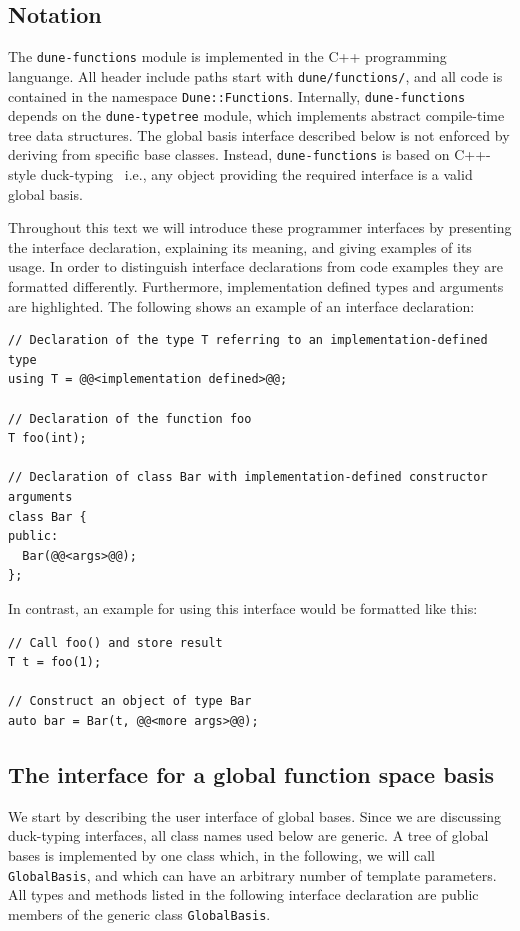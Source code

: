 \documentclass[a4paper,10pt,headings=normal,bibliography=totoc]{scrartcl}
\newcommand{\cpp}[1]{\lstinline[basicstyle=\ttfamily]!#1!}
\newcommand{\dunemodule}[1]{\texttt{#1}}
\begin{document}
\subsection*{Notation}

The \dunemodule{dune-functions} module is implemented in the C++ programming languange.
All header include paths
start with \cpp{dune/functions/}, and all code is contained in the namespace \cpp{Dune::Functions}.
Internally, \dunemodule{dune-functions} depends on the \dunemodule{dune-typetree} module,
which implements abstract compile-time tree data structures.
The global basis interface described below is not enforced by deriving
from specific base classes. Instead, \dunemodule{dune-functions} is based on
C++-style duck-typing~\cite{koenig_moo:2005}
i.e., any object providing the required
interface is a valid global basis.

Throughout this text we will introduce these programmer interfaces
by presenting the interface declaration, explaining
its meaning, and giving examples of its usage.
In order to distinguish interface declarations
from code examples they are formatted differently.
Furthermore, implementation defined types and arguments are highlighted.
The following shows an example of an interface declaration:
\begin{lstlisting}[style=Interface]
// Declaration of the type T referring to an implementation-defined type
using T = @@<implementation defined>@@;

// Declaration of the function foo
T foo(int);

// Declaration of class Bar with implementation-defined constructor arguments
class Bar {
public:
  Bar(@@<args>@@);
};
\end{lstlisting}
In contrast,
an example for using this interface would be formatted like this:
\begin{lstlisting}[style=Example]
// Call foo() and store result
T t = foo(1);

// Construct an object of type Bar
auto bar = Bar(t, @@<more args>@@);
\end{lstlisting}


\subsection{The interface for a global function space basis}
We start by describing the user interface of global bases.  Since we are discussing duck-typing interfaces,
all class names used below are generic. A tree of global bases is implemented by one class which,
in the following, we will call \cpp{GlobalBasis}, and which
can have an arbitrary number of template parameters.
All types and methods listed in the following
interface declaration are public members of
the generic class \cpp{GlobalBasis}.
\end{document}

